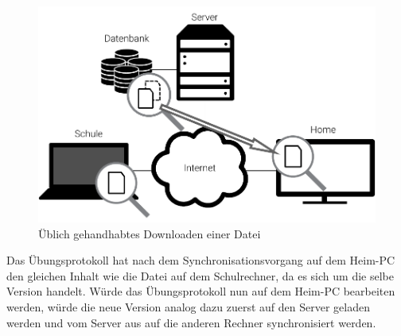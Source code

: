 \begin{figure}[htb]
	\centering
  \includegraphics[]{images/dropbox_download}
  \caption{Üblich gehandhabtes Downloaden einer Datei}
	\label{dropbox_download}
\end{figure}

Das Übungsprotokoll hat nach dem Synchronisationsvorgang auf dem Heim-PC
den gleichen Inhalt wie die Datei auf dem Schulrechner, da es sich um die selbe Version
handelt. Würde das Übungsprotokoll nun auf dem Heim-PC bearbeiten werden, würde
die neue Version analog dazu zuerst auf den Server geladen werden und vom Server
aus auf die anderen Rechner synchronisiert werden.
